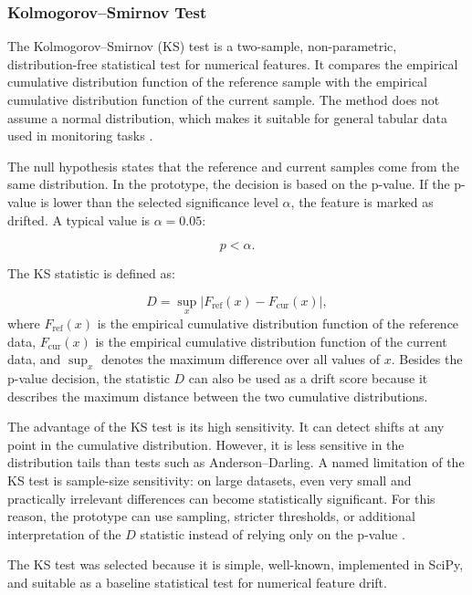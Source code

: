 \subsubsection{Kolmogorov--Smirnov Test}

The Kolmogorov--Smirnov (KS) test is a two-sample, non-parametric, distribution-free statistical test for numerical features. It compares the empirical cumulative distribution function of the reference sample with the empirical cumulative distribution function of the current sample. The method does not assume a normal distribution, which makes it suitable for general tabular data used in monitoring tasks \cite{ConoverNonparametric1999,SciPyDocumentation}.

The null hypothesis states that the reference and current samples come from the same distribution. In the prototype, the decision is based on the p-value. If the p-value is lower than the selected significance level $\alpha$, the feature is marked as drifted. A typical value is $\alpha = 0.05$:

\begin{equation}
p < \alpha.
\end{equation}

The KS statistic is defined as:

\begin{equation}
D = \sup_x \left| F_{\mathrm{ref}}(x) - F_{\mathrm{cur}}(x) \right|,
\end{equation}
where $F_{\mathrm{ref}}(x)$ is the empirical cumulative distribution function of the reference data, $F_{\mathrm{cur}}(x)$ is the empirical cumulative distribution function of the current data, and $\sup_x$ denotes the maximum difference over all values of $x$. Besides the p-value decision, the statistic $D$ can also be used as a drift score because it describes the maximum distance between the two cumulative distributions.

The advantage of the KS test is its high sensitivity. It can detect shifts at any point in the cumulative distribution. However, it is less sensitive in the distribution tails than tests such as Anderson--Darling. A named limitation of the KS test is sample-size sensitivity: on large datasets, even very small and practically irrelevant differences can become statistically significant. For this reason, the prototype can use sampling, stricter thresholds, or additional interpretation of the $D$ statistic instead of relying only on the p-value \cite{EvidentlyDataDriftLargeDatasets}.

The KS test was selected because it is simple, well-known, implemented in SciPy, and suitable as a baseline statistical test for numerical feature drift.

